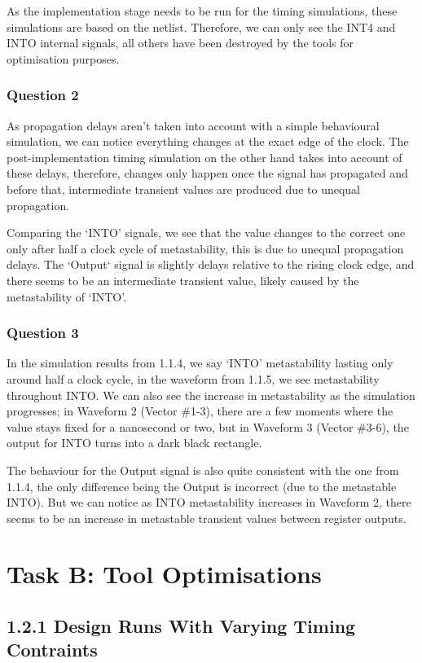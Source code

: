 \documentclass[11pt]{report}
\begin{document}
As the implementation stage needs to be run for the timing simulations, these simulations are based on the netlist. Therefore, we can only see the INT4 and INTO internal signals, all others have been destroyed by the tools for optimisation purposes.

\subsection*{Question 2}
As propagation delays aren't taken into account with a simple behavioural simulation, we can notice everything changes at the exact edge of the clock. The post-implementation timing simulation on the other hand takes into account of these delays, therefore, changes only happen once the signal has propagated and before that, intermediate transient values are produced due to unequal propagation.

Comparing the `INTO' signals, we see that the value changes to the correct one only after half a clock cycle of metastability, this is due to unequal propagation delays. The `Output` signal is slightly delays relative to the rising clock edge, and there seems to be an intermediate transient value, likely caused by the metastability of `INTO'.

\subsection*{Question 3}
In the simulation results from 1.1.4, we say `INTO' metastability lasting only around half a clock cycle, in the waveform from 1.1.5, we see metastability throughout INTO. We can also see the increase in metastability as the simulation progresses; in Waveform 2 (Vector \#1-3), there are a few moments where the value stays fixed for a nanosecond or two, but in Waveform 3 (Vector \#3-6), the output for INTO turns into a dark black rectangle.

The behaviour for the Output signal is also quite consistent with the one from 1.1.4, the only difference being the Output is incorrect (due to the metastable INTO). But we can notice as INTO metastability increases in Waveform 2, there seems to be an increase in metastable transient values between register outputs.


\chapter*{Task B: Tool Optimisations}

\section*{1.2.1 Design Runs With Varying Timing Contraints}
\end{document}
